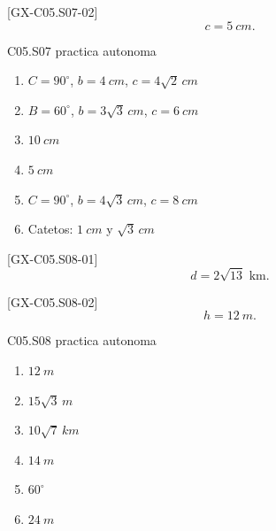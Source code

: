 \begin{shortanswer}{[GX-C05.S07-02]}
\[
c=\SI{5}{cm}.
\]
\end{shortanswer}

\begin{shortanswer}{C05.S07 practica autonoma}
\begin{enumerate}[label=\textbf{PX-C05.S07-\arabic*:}, leftmargin=*]
  \item \(C=90^\circ\), \(b=\SI{4}{cm}\), \(c=4\sqrt{2}\,\si{cm}\)
  \item \(B=60^\circ\), \(b=3\sqrt{3}\,\si{cm}\), \(c=\SI{6}{cm}\)
  \item \(\SI{10}{cm}\)
  \item \(\SI{5}{cm}\)
  \item \(C=90^\circ\), \(b=4\sqrt{3}\,\si{cm}\), \(c=\SI{8}{cm}\)
  \item Catetos: \(\SI{1}{cm}\) y \(\sqrt{3}\,\si{cm}\)
\end{enumerate}
\end{shortanswer}

\begin{shortanswer}{[GX-C05.S08-01]}
\[
d=2\sqrt{13}\text{ km}.
\]
\end{shortanswer}

\begin{shortanswer}{[GX-C05.S08-02]}
\[
h=\SI{12}{m}.
\]
\end{shortanswer}

\begin{shortanswer}{C05.S08 practica autonoma}
\begin{enumerate}[label=\textbf{PX-C05.S08-\arabic*:}, leftmargin=*]
  \item \(\SI{12}{m}\)
  \item \(15\sqrt{3}\,\si{m}\)
  \item \(10\sqrt{7}\,\si{km}\)
  \item \(\SI{14}{m}\)
  \item \(60^\circ\)
  \item \(\SI{24}{m}\)
\end{enumerate}
\end{shortanswer}
